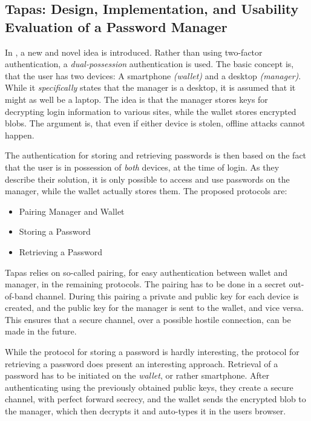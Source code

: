 


		\subsection*{Tapas: Design, Implementation, and Usability Evaluation of a Password Manager}
			In \cite{tapas}, a new and novel idea is introduced. Rather than using two-factor authentication, a \emph{dual-possession} authentication is used. The basic concept is, that the user has two devices: A smartphone \emph{(wallet)} and a desktop \emph{(manager)}. While it \emph{specifically} states that the manager is a desktop, it is assumed that it might as well be a laptop. The idea is that the manager stores keys for decrypting login information to various sites, while the wallet stores encrypted blobs. The argument is, that even if either device is stolen, offline attacks cannot happen.

			The authentication for storing and retrieving passwords is then based on the fact that the user is in possession of \emph{both} devices, at the time of login. As they describe their solution, it is only possible to access and use passwords on the manager, while the wallet actually stores them. The proposed protocols are:
			\begin{itemize}
				\item Pairing Manager and Wallet
				\item Storing a Password
				\item Retrieving a Password
			\end{itemize}

			Tapas relies on so-called pairing, for easy authentication between wallet and manager, in the remaining protocols. The pairing has to be done in a secret out-of-band channel. During this pairing a private and public key for each device is created, and the public key for the manager is sent to the wallet, and vice versa. This ensures that a secure channel, over a possible hostile connection, can be made in the future.

			While the protocol for storing a password is hardly interesting, the protocol for retrieving a password does present an interesting approach. Retrieval of a password has to be initiated on the \emph{wallet}, or rather smartphone. After authenticating using the previously obtained public keys, they create a secure channel, with perfect forward secrecy, and the wallet sends the encrypted blob to the manager, which then decrypts it and auto-types it in the users browser.

